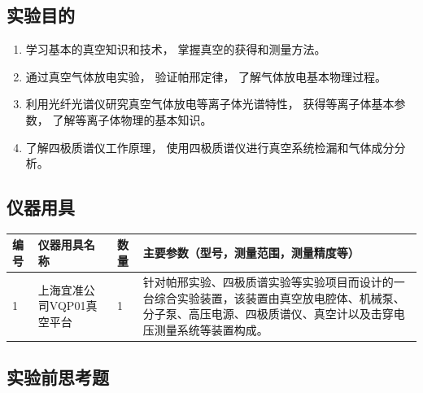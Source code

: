 \documentclass[dvipsnames, svgnames,a4paper,11pt]{article}
\begin{document}
\subsection{实验目的}
\begin{enumerate}
	\item 学习基本的真空知识和技术， 掌握真空的获得和测量方法。
	\item 通过真空气体放电实验， 验证帕邢定律， 了解气体放电基本物理过程。
	\item 利用光纤光谱仪研究真空气体放电等离子体光谱特性， 获得等离子体基本参数， 了解等离子体物理的基本知识。
	\item 了解四极质谱仪工作原理， 使用四极质谱仪进行真空系统检漏和气体成分分析。
	
\end{enumerate}

\subsection{仪器用具}


\begin{table}[htbp]
	\centering
	\renewcommand\arraystretch{1.6}
	\begin{tabular}{p{}|p{}|p{}|p{}}
		\hline
		编号& 仪器用具名称 & 数量 &  主要参数（型号，测量范围，测量精度等） \\
		\hline
		1 & 上海宜准公司VQP01真空平台 & 1 & 针对帕邢实验、四极质谱实验等实验项目而设计的一台综合实验装置，该装置由真空放电腔体、机械泵、分子泵、高压电源、四极质谱仪、真空计以及击穿电压测量系统等装置构成。 \\
		
		\hline
	\end{tabular}
	\label{tbl:gamma 能谱测量实验用具}
\end{table}










\subsection{实验前思考题}
\end{document}
